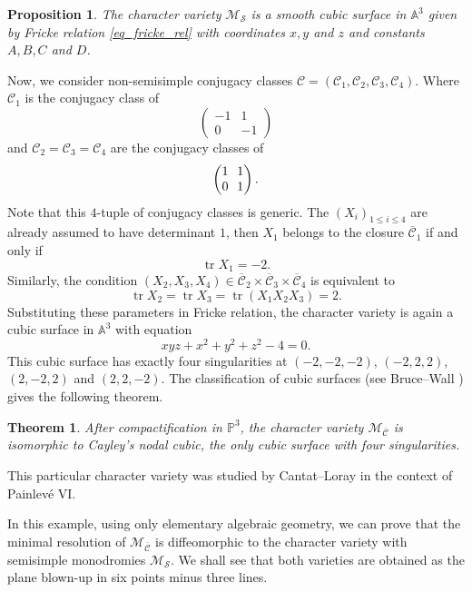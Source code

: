 \documentclass[11pt]{article}
\theoremstyle{definition}
\theoremstyle{plain}
\newtheorem{theorem}[definition]{Theorem}
\newtheorem{proposition}[definition]{Proposition}
\DeclareMathOperator{\tr}{tr}
\begin{document}
\begin{proposition}
The character variety $\mathcal{M}_{\boldsymbol{\mathcal{S}}}$ is a smooth cubic surface in $\mathbb{A}^3$ given by Fricke relation \eqref{eq_fricke_rel} with coordinates $x,y$ and $z$ and constants $A, B, C$ and $D$.
\end{proposition}

Now, we consider non-semisimple conjugacy classes $\boldsymbol{\mathcal{C}}=\left(\mathcal{C}_1,\mathcal{C}_2,\mathcal{C}_3,\mathcal{C}_4\right)$. Where $\mathcal{C}_1$ is the conjugacy class of
\[
\begin{pmatrix}
-1 & 1 \\
0 & -1
\end{pmatrix}
\]
and $\mathcal{C}_2=\mathcal{C}_3 = \mathcal{C}_4$ are the conjugacy classes of
\[\arraycolsep3.5pt
\begin{pmatrix}
1 & 1 \\
0 & 1
\end{pmatrix}.
\]
Note that this $4$-tuple of conjugacy classes is generic. The $(X_i)_{1\le i \le 4}$ are already assumed to have determinant $1$, then $X_1$ belongs to the closure $\overline{\mathcal{C}}_1$ if and only if
\[
\tr X_1 = -2.
\]
Similarly, the condition $(X_2, X_3, X_4)\in \overline{\mathcal{C}}_2\times \overline{\mathcal{C}}_3 \times
\overline{\mathcal{C}}_4$ is equivalent to
\[
\tr X_2 = \tr X_3 = \tr (X_1 X_2 X_3)= 2.
\]
Substituting these parameters in Fricke relation, the character variety is again a cubic surface in $\mathbb{A}^3$ with equation
\begin{equation}\label{eq_cayley_char}
x y z + x^2 +y^2 +z^2 - 4 =0.
\end{equation}
This cubic surface has exactly four singularities at $(-2,-2,-2)$, $(-2,2,2)$, $(2,-2,2)$ and $(2,2,-2)$.
The classification of cubic surfaces (see Bruce--Wall \cite{Bruce_cubic}) gives the following theorem.
\begin{theorem}\label{th_compactification_cayley}
After compactification in $\mathbb{P}^3$, the character variety $\mathcal{M}_{\overline{\boldsymbol{\mathcal{C}}}}$ is isomorphic to Cayley's nodal cubic, the only cubic surface with four singularities.
\end{theorem}
This particular character variety was studied by Cantat--Loray \cite{Cantat_Loray} in the context of Painlevé VI.

In this example, using only elementary algebraic geometry, we can prove that the minimal resolution of $\mathcal{M}_{\overline{\boldsymbol{\mathcal{C}}}}$ is diffeomorphic to the character variety with semisimple monodromies $\mathcal{M}_{\boldsymbol{\mathcal{S}}}$. We shall see that both varieties are obtained as the plane blown-up in six points minus three lines.
\end{document}
